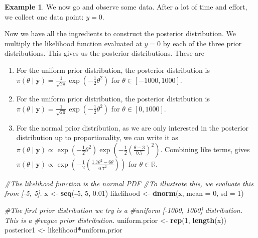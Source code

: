 \documentclass[
]{book}
\newenvironment{Shaded}{\begin{snugshade}}{\end{snugshade}}
\newcommand{\AttributeTok}[1]{\textcolor[rgb]{0.13,0.29,0.53}{#1}}
\newcommand{\CommentTok}[1]{\textcolor[rgb]{0.56,0.35,0.01}{\textit{#1}}}
\newcommand{\DecValTok}[1]{\textcolor[rgb]{0.00,0.00,0.81}{#1}}
\newcommand{\FloatTok}[1]{\textcolor[rgb]{0.00,0.00,0.81}{#1}}
\newcommand{\FunctionTok}[1]{\textcolor[rgb]{0.13,0.29,0.53}{\textbf{#1}}}
\newcommand{\NormalTok}[1]{#1}
\newcommand{\OtherTok}[1]{\textcolor[rgb]{0.56,0.35,0.01}{#1}}
\newcommand{\SpecialCharTok}[1]{\textcolor[rgb]{0.81,0.36,0.00}{\textbf{#1}}}
\providecommand{\tightlist}{%
  \setlength{\itemsep}{0pt}\setlength{\parskip}{0pt}}
\theoremstyle{definition}
\theoremstyle{definition}
\newtheorem{example}{Example}[chapter]
\theoremstyle{definition}
\theoremstyle{definition}
\theoremstyle{remark}
\begin{document}
\begin{example}
We now go and observe some data. After a lot of time and effort, we collect one data point: \(y = 0\).

Now we have all the ingredients to construct the posterior distribution. We multiply the likelihood function evaluated at \(y = 0\) by each of the three prior distributions. This gives us the posterior distributions. These are

\begin{enumerate}
\def\labelenumi{\arabic{enumi}.}
\tightlist
\item
  For the uniform prior distribution, the posterior distribution is \(\pi(\theta \mid \boldsymbol{y}) = \frac{1}{\sqrt{2\pi}}\exp\left(-\frac{1}{2}\theta^2\right)\) for \(\theta \in [-1000, 1000]\).\\
\item
  For the uniform prior distribution, the posterior distribution is \(\pi(\theta \mid \boldsymbol{y}) = \frac{1}{\sqrt{2\pi}}\exp\left(-\frac{1}{2}\theta^2\right)\) for \(\theta \in [0, 1000]\).
\item
  For the normal prior distribution, as we are only interested in the posterior distribution up to proportionality, we can write it as \(\pi(\theta \mid \boldsymbol{y}) \propto \exp\left(-\frac{1}{2}\theta^2\right)\exp\left(-\frac{1}{2}\left(\frac{\theta - 3}{0.7}\right)^2\right)\). Combining like terms, gives \(\pi(\theta \mid \boldsymbol{y}) \propto \exp\left(-\frac{1}{2}\left(\frac{1.7\theta^2 - 6\theta}{0.7^2}\right)\right)\) for \(\theta \in \mathbb{R}\).
\end{enumerate}

\begin{Shaded}
\begin{Highlighting}[]
\CommentTok{\#The likelihood function is the normal PDF}
\CommentTok{\#To illustrate this, we evaluate this from [{-}5, 5].}
\NormalTok{x }\OtherTok{\textless{}{-}} \FunctionTok{seq}\NormalTok{(}\SpecialCharTok{{-}}\DecValTok{5}\NormalTok{, }\DecValTok{5}\NormalTok{, }\FloatTok{0.01}\NormalTok{)}
\NormalTok{likelihood }\OtherTok{\textless{}{-}} \FunctionTok{dnorm}\NormalTok{(x, }\AttributeTok{mean =} \DecValTok{0}\NormalTok{, }\AttributeTok{sd =} \DecValTok{1}\NormalTok{)}

\CommentTok{\#The first prior distribution we try is a }
\CommentTok{\#uniform [{-}1000, 1000] distribution. This is a }
\CommentTok{\#vague prior distribution. }
\NormalTok{uniform.prior }\OtherTok{\textless{}{-}} \FunctionTok{rep}\NormalTok{(}\DecValTok{1}\NormalTok{, }\FunctionTok{length}\NormalTok{(x))}
\NormalTok{posterior1 }\OtherTok{\textless{}{-}}\NormalTok{ likelihood}\SpecialCharTok{*}\NormalTok{uniform.prior}



\end{Highlighting}
\end{Shaded}
\end{example}
\end{document}
